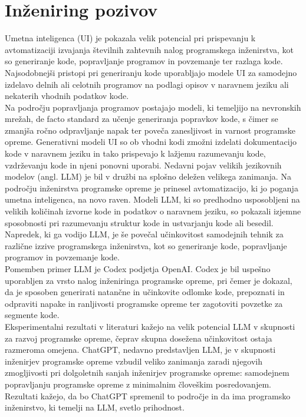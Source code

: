 \documentclass[a4paper,12pt,openright]{book}
\begin{document}
\section{Inženiring pozivov} \label{chap:inz-poz}

Umetna inteligenca (UI) je pokazala velik potencial pri prispevanju k avtomatizaciji izvajanja številnih zahtevnih nalog programskega inženirstva, kot so generiranje kode, popravljanje programov in povzemanje ter razlaga kode. \cite{bavishi2019autopandas} \\
Najsodobnejši pristopi pri generiranju kode uporabljajo modele UI za samodejno izdelavo delnih ali celotnih programov na podlagi opisov v naravnem jeziku ali nekaterih vhodnih podatkov kode. \cite{Chen2021EvaluatingLL}\\
Na področju popravljanja programov postajajo modeli, ki temeljijo na nevronskih mrežah, de facto standard za učenje generiranja popravkov kode, s čimer se zmanjša ročno odpravljanje napak ter poveča zanesljivost in varnost programske opreme. Generativni modeli UI so ob vhodni kodi zmožni izdelati dokumentacijo kode v naravnem jeziku in tako prispevajo k lažjemu razumevanju kode, vzdrževanju kode in njeni ponovni uporabi. Nedavni pojav velikih jezikovnih modelov (angl. LLM) je bil v družbi na splošno deležen velikega zanimanja. Na področju inženirstva programske opreme je prinesel avtomatizacijo, ki jo poganja umetna inteligenca, na novo raven. Modeli LLM, ki so predhodno usposobljeni na velikih količinah izvorne kode in podatkov o naravnem jeziku, so pokazali izjemne sposobnosti pri razumevanju struktur kode in ustvarjanju kode ali besedil. Napredek, ki ga vodijo LLM, je še povečal učinkovitost samodejnih tehnik za različne izzive programskega inženirstva, kot so generiranje kode, popravljanje programov in povzemanje kode. \cite{wan2018improving}\\
Pomemben primer LLM je  Codex podjetja OpenAI. Codex je bil uspešno uporabljen za vrsto nalog inženiringa programske opreme, pri čemer je dokazal, da je sposoben generirati natančne in učinkovite odlomke kode, prepoznati in odpraviti napake in ranljivosti programske opreme ter zagotoviti povzetke za segmente kode. \cite{vaithilingam2022expectation} \\
Eksperimentalni rezultati v literaturi kažejo na velik potencial LLM v skupnosti za razvoj programske opreme, čeprav skupna dosežena učinkovitost ostaja razmeroma omejena. ChatGPT, nedavno predstavljen LLM, je v skupnosti inženirjev programske opreme vzbudil veliko zanimanja zaradi njegovih zmogljivosti pri dolgoletnih sanjah inženirjev programske opreme: samodejnem popravljanju programske opreme z minimalnim človeškim posredovanjem. Rezultati kažejo, da bo ChatGPT spremenil to področje in da ima programsko inženirstvo, ki temelji na LLM, svetlo prihodnost. \cite{tian2023chatgptultimateprogrammingassistant} \\
\end{document}
